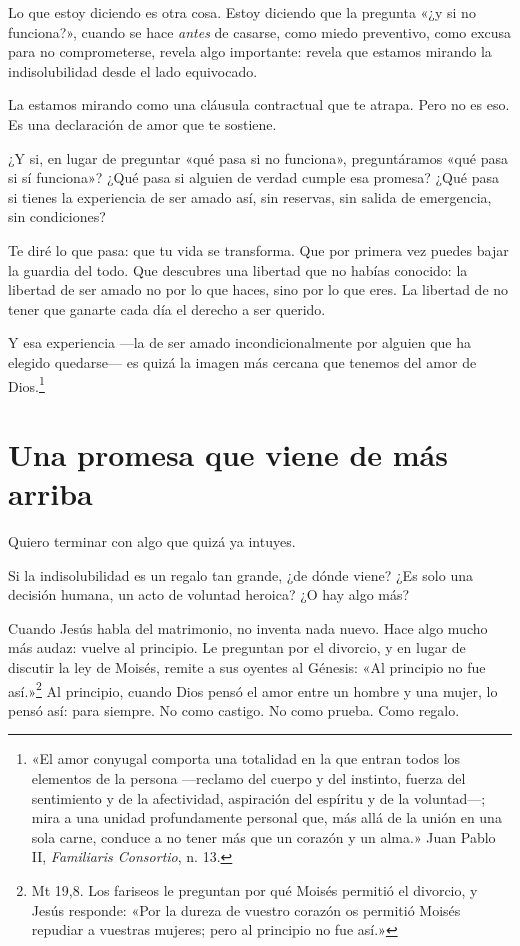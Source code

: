 Lo que estoy diciendo es otra cosa. Estoy diciendo que la pregunta «¿y si no funciona?», cuando se hace \emph{antes} de casarse, como miedo preventivo, como excusa para no comprometerse, revela algo importante: revela que estamos mirando la indisolubilidad desde el lado equivocado.

La estamos mirando como una cláusula contractual que te atrapa. Pero no es eso. Es una declaración de amor que te sostiene.

¿Y si, en lugar de preguntar «qué pasa si no funciona», preguntáramos «qué pasa si sí funciona»? ¿Qué pasa si alguien de verdad cumple esa promesa? ¿Qué pasa si tienes la experiencia de ser amado así, sin reservas, sin salida de emergencia, sin condiciones?

Te diré lo que pasa: que tu vida se transforma. Que por primera vez puedes bajar la guardia del todo. Que descubres una libertad que no habías conocido: la libertad de ser amado no por lo que haces, sino por lo que eres. La libertad de no tener que ganarte cada día el derecho a ser querido.

Y esa experiencia ---la de ser amado incondicionalmente por alguien que ha elegido quedarse--- es quizá la imagen más cercana que tenemos del amor de Dios.\footnote{«El amor conyugal comporta una totalidad en la que entran todos los elementos de la persona ---reclamo del cuerpo y del instinto, fuerza del sentimiento y de la afectividad, aspiración del espíritu y de la voluntad---; mira a una unidad profundamente personal que, más allá de la unión en una sola carne, conduce a no tener más que un corazón y un alma.» Juan Pablo II, \textit{Familiaris Consortio}, n. 13.}

\section{Una promesa que viene de más arriba}

Quiero terminar con algo que quizá ya intuyes.

Si la indisolubilidad es un regalo tan grande, ¿de dónde viene? ¿Es solo una decisión humana, un acto de voluntad heroica? ¿O hay algo más?

Cuando Jesús habla del matrimonio, no inventa nada nuevo. Hace algo mucho más audaz: vuelve al principio. Le preguntan por el divorcio, y en lugar de discutir la ley de Moisés, remite a sus oyentes al Génesis: «Al principio no fue así.»\footnote{Mt 19,8. Los fariseos le preguntan por qué Moisés permitió el divorcio, y Jesús responde: «Por la dureza de vuestro corazón os permitió Moisés repudiar a vuestras mujeres; pero al principio no fue así.»} Al principio, cuando Dios pensó el amor entre un hombre y una mujer, lo pensó así: para siempre. No como castigo. No como prueba. Como regalo.

